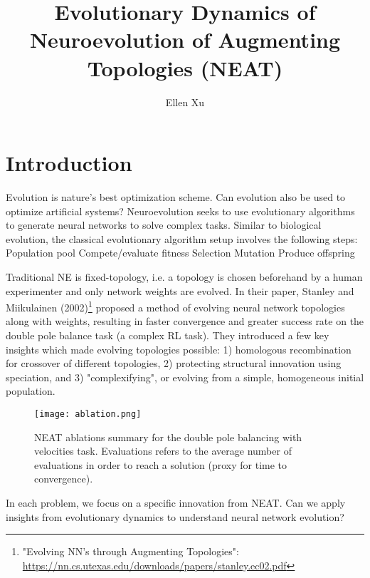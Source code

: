 \documentclass[12pt]{article}
\begin{document}
 
%

\title{\textbf{ Evolutionary Dynamics of Neuroevolution of Augmenting Topologies (NEAT)} \\
  \vspace{0.5em}
  }
\author{Ellen Xu}
\maketitle
\section{Introduction}

Evolution is nature's best optimization scheme. Can evolution also be used to optimize artificial systems? Neuroevolution seeks to use evolutionary algorithms to generate neural networks to solve complex tasks. Similar to biological evolution, the classical evolutionary algorithm setup involves the following steps:
Population pool
Compete/evaluate fitness
Selection
Mutation
Produce offspring

Traditional NE is fixed-topology, i.e. a topology is chosen beforehand by a human experimenter and only network weights are evolved. In their paper, Stanley and Miikulainen (2002)\footnote{"Evolving NN's through Augmenting Topologies": \url{https://nn.cs.utexas.edu/downloads/papers/stanley.ec02.pdf}} proposed a method of evolving neural network topologies along with weights, resulting in faster convergence and greater success rate on the double pole balance task (a complex RL task). They introduced a few key insights which made evolving topologies possible: 1) homologous recombination for crossover of different topologies, 2) protecting structural innovation using speciation, and 3) "complexifying", or evolving from a simple, homogeneous initial population.

\begin{figure}
    \centering
    \texttt{[image: ablation.png]}
    \caption{NEAT ablations summary for the double pole balancing with velocities task. Evaluations refers to the average number of evaluations in order to reach a solution (proxy for time to convergence).}
    \label{fig:ablation}
\end{figure}

In each problem, we focus on a specific innovation from NEAT. Can we apply insights from evolutionary dynamics to understand neural network evolution?
\end{document}
